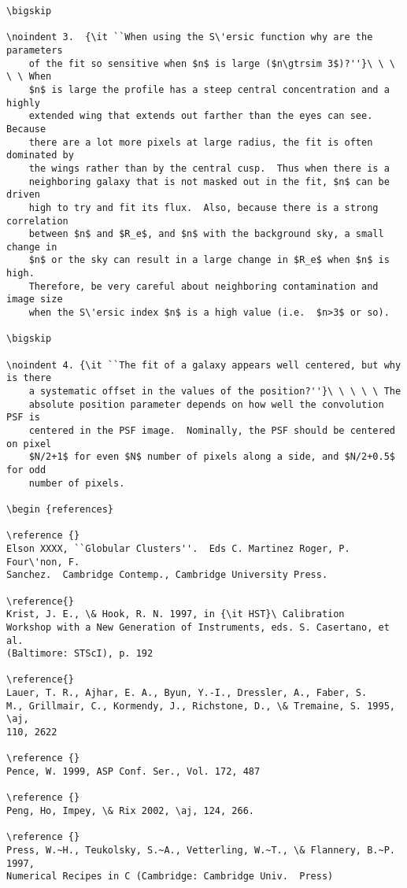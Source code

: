 \documentclass[preprint]{aastex}
\begin{document}
\begin {verbatim}
\bigskip

\noindent 3.  {\it ``When using the S\'ersic function why are the parameters
    of the fit so sensitive when $n$ is large ($n\gtrsim 3$)?''}\ \ \ \ \ When
    $n$ is large the profile has a steep central concentration and a highly
    extended wing that extends out farther than the eyes can see.  Because
    there are a lot more pixels at large radius, the fit is often dominated by
    the wings rather than by the central cusp.  Thus when there is a
    neighboring galaxy that is not masked out in the fit, $n$ can be driven
    high to try and fit its flux.  Also, because there is a strong correlation
    between $n$ and $R_e$, and $n$ with the background sky, a small change in
    $n$ or the sky can result in a large change in $R_e$ when $n$ is high.
    Therefore, be very careful about neighboring contamination and image size
    when the S\'ersic index $n$ is a high value (i.e.  $n>3$ or so).

\bigskip

\noindent 4. {\it ``The fit of a galaxy appears well centered, but why is there
    a systematic offset in the values of the position?''}\ \ \ \ \ The
    absolute position parameter depends on how well the convolution PSF is
    centered in the PSF image.  Nominally, the PSF should be centered on pixel
    $N/2+1$ for even $N$ number of pixels along a side, and $N/2+0.5$ for odd
    number of pixels.

\begin {references}

\reference {} 
Elson XXXX, ``Globular Clusters''.  Eds C. Martinez Roger, P.  Four\'non, F.
Sanchez.  Cambridge Contemp., Cambridge University Press.

\reference{}
Krist, J. E., \& Hook, R. N. 1997, in {\it HST}\ Calibration
Workshop with a New Generation of Instruments, eds. S. Casertano, et al.
(Baltimore: STScI), p. 192

\reference{} 
Lauer, T. R., Ajhar, E. A., Byun, Y.-I., Dressler, A., Faber, S.
M., Grillmair, C., Kormendy, J., Richstone, D., \& Tremaine, S. 1995, \aj,
110, 2622

\reference {}
Pence, W. 1999, ASP Conf. Ser., Vol. 172, 487

\reference {}
Peng, Ho, Impey, \& Rix 2002, \aj, 124, 266.

\reference {}
Press, W.~H., Teukolsky, S.~A., Vetterling, W.~T., \& Flannery, B.~P. 1997,
Numerical Recipes in C (Cambridge: Cambridge Univ.  Press)


\end{verbatim}
\end{document}
